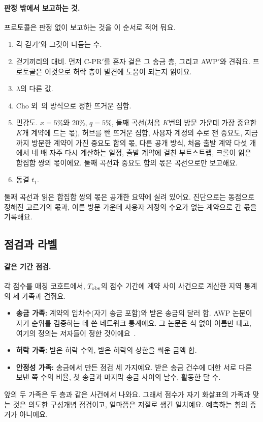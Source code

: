 \paragraph{판정 밖에서 보고하는 것.}
프로토콜은 판정 없이 보고하는 것을 이 순서로 적어 둬요.
\begin{enumerate}
\item 각 걷기$'$와 그것이 다듬는 수.
\item 걷기끼리의 대비. 먼저 C-PR$'$를 혼자 걸은 그 송금 층, 그리고 AWP$'$와 견줘요. 프로토콜은 이것으로 허락 층이 발견에 도움이 되는지 읽어요.
\item $\lambda$의 다른 값.
\item Cho 외~\cite{cho1998crawling}의 방식으로 정한 뜨거운 집합.
\item 민감도. $x=5\%$와 20\%, $q=5\%$, 둘째 곡선(처음 $K$번의 방문 가운데 가장 중요한 $K$개 계약에 드는 몫), 허브를 뺀 뜨거운 집합, 사용자 계정의 수로 잰 중요도, 지금까지 방문한 계약이 가진 중요도 합의 몫, 다른 공개 방식, 처음 출발 계약 다섯 개에서 네 배 자주 다시 계산하는 일정, 출발 계약에 걸친 부트스트랩, 크롤이 읽은 합집합 쌍의 몫이에요. 둘째 곡선과 중요도 합의 몫은 곡선으로만 보고해요.
\item 동결 $t_1$.
\end{enumerate}
둘째 곡선과 읽은 합집합 쌍의 몫은 공개한 요약에 실려 있어요. 진단으로는 동점으로 정해진 고르기의 몫과, 이른 방문 가운데 사용자 계정의 수요가 없는 계약으로 간 몫을 기록해요.

\subsection{점검과 라벨}

\paragraph{같은 기간 점검.}
각 점수를 매칭 코호트에서, $T_{\mathrm{obs}}$의 점수 기간에 계약 사이 사건으로 계산한 지역 통계의 세 가족과 견줘요.
\begin{itemize}
\item \textbf{송금 가족:} 계약의 입차수(자기 송금 포함)와 받은 송금의 달러 합. AWP 논문이 자기 순위를 검증하는 데 쓴 네트워크 통계예요. 그 논문은 식 없이 이름만 대고, 여기의 정의는 저자들이 정한 것이에요~\cite{do2023awp}.
\item \textbf{허락 가족:} 받은 허락 수와, 받은 허락의 상한을 씌운 금액 합.
\item \textbf{안정성 가족:} 송금에서 만든 점검 세 가지예요. 받은 송금 건수에 대한 서로 다른 보낸 쪽 수의 비율, 첫 송금과 마지막 송금 사이의 날수, 활동한 달 수.
\end{itemize}
앞의 두 가족은 두 층과 같은 사건에서 나와요. 그래서 점수가 자기 화살표의 가족과 맞는 것은 의도한 구성개념 점검이고, 얼마쯤은 저절로 생긴 일치예요. 예측하는 힘의 증거가 아니에요.

